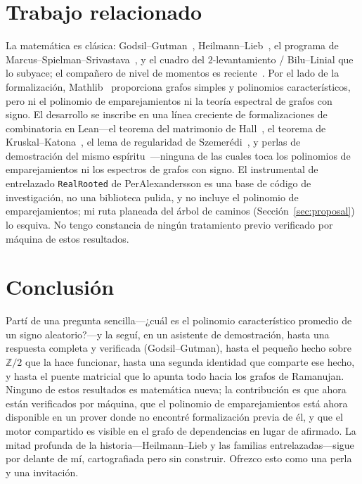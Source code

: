 \documentclass[11pt]{article}
\newcommand{\Z}{\mathbb{Z}}
\begin{document}
\section{Trabajo relacionado}
\label{sec:related}

La matemática es clásica: Godsil--Gutman~\cite{GodsilGutman1981},
Heilmann--Lieb~\cite{HeilmannLieb1972}, el programa de
Marcus--Spielman--Srivastava~\cite{MSS2015a,MSS2015b}, y el cuadro del
$2$-levantamiento / Bilu--Linial que lo subyace; el compañero de nivel de momentos
es reciente~\cite{ChenVanDamBu2023}. Por el lado de la formalización,
Mathlib~\cite{Mathlib2020} proporciona grafos simples y polinomios
característicos, pero ni el polinomio de emparejamientos ni la teoría espectral de
grafos con signo. El desarrollo se inscribe en una línea creciente de
formalizaciones de combinatoria en Lean---el teorema del matrimonio de
Hall~\cite{GusakovMehtaMiller2021}, el teorema de
Kruskal--Katona~\cite{Mehta2022KruskalKatona}, el lema de regularidad de
Szemer\'edi~\cite{DilliesMehta2022}, y perlas de demostración del mismo
espíritu~\cite{Mehta2023Sharkovsky}---ninguna de las cuales toca los polinomios de
emparejamientos ni los espectros de grafos con signo. El instrumental de
entrelazado \texttt{RealRooted} de PerAlexandersson es una base de código de
investigación, no una biblioteca pulida, y no incluye el polinomio de
emparejamientos; mi ruta planeada del árbol de caminos
(Sección~\ref{sec:proposal}) lo esquiva. No tengo constancia de ningún tratamiento
previo verificado por máquina de estos resultados.

\section{Conclusión}

Partí de una pregunta sencilla---¿cuál es el polinomio característico promedio de
un signo aleatorio?---y la seguí, en un asistente de demostración, hasta una
respuesta completa y verificada (Godsil--Gutman), hasta el pequeño hecho sobre
$\Z/2$ que la hace funcionar, hasta una segunda identidad que comparte ese hecho, y
hasta el puente matricial que lo apunta todo hacia los grafos de Ramanujan.
Ninguno de estos resultados es matemática nueva; la contribución es que ahora están
verificados por máquina, que el polinomio de emparejamientos está ahora
disponible en un prover donde no encontré formalización previa de él, y que el
motor compartido es visible en el grafo de dependencias
en lugar de afirmado. La mitad profunda de la historia---Heilmann--Lieb y las
familias entrelazadas---sigue por delante de mí, cartografiada pero sin construir.
Ofrezco esto como una perla y una invitación.
\end{document}
